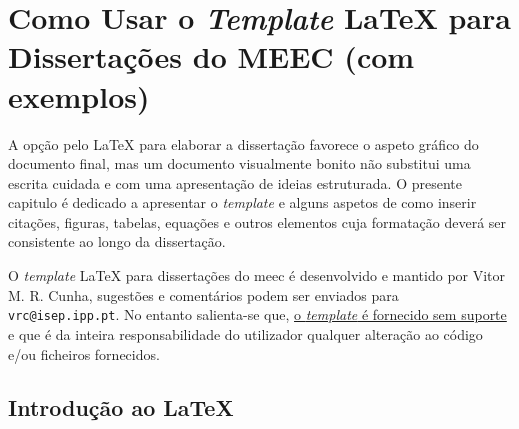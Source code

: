 
\chapter{Como Usar o \textit{Template} \LaTeX{} para Dissertações do MEEC (com exemplos)}	%
\label{Chapter2}	%


A opção pelo \LaTeX{} para elaborar a dissertação favorece o aspeto gráfico do documento final, mas um documento visualmente bonito não substitui uma escrita cuidada e com uma apresentação de ideias estruturada. O presente capitulo é dedicado a apresentar o \textit{template} e alguns aspetos de como inserir citações, figuras, tabelas, equações e outros elementos cuja formatação deverá ser consistente ao longo da dissertação.

O \textit{template} \LaTeX{} para dissertações do \ac{meec} é desenvolvido e mantido por Vitor M. R. Cunha, sugestões e comentários podem ser enviados para \verb|vrc@isep.ipp.pt|. No entanto salienta-se que, \underline{o \textit{template} é fornecido sem suporte} e que é da inteira responsabilidade do utilizador qualquer alteração ao código e/ou ficheiros fornecidos.

\section{Introdução ao \LaTeX{}}
\label{sec:Ch2.1}


